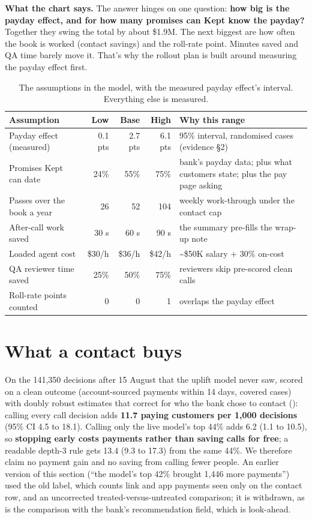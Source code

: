 \documentclass[11pt]{article}
\begin{document}
\textbf{What the chart says.} The answer hinges on one question: \textbf{how big is the payday effect, and for how many
promises can Kept know the payday?} Together they swing the total by about \$1.9M. The next biggest are how often the book is worked (contact savings) and
the roll-rate point. Minutes saved and QA time barely move it. That's why the rollout plan is built around measuring the
payday effect first.

\begin{table}[htbp]\small\centering
\begin{tabularx}{\linewidth}{@{}lrrrL@{}}
\toprule
\textbf{Assumption} & \textbf{Low} & \textbf{Base} & \textbf{High} & \textbf{Why this range} \\
\midrule
Payday effect (measured) & 0.1 pts & 2.7 pts & 6.1 pts & 95\% interval, randomised cases (evidence §2) \\
Promises Kept can date & 24\% & 55\% & 75\% & bank's payday data; plus what customers state; plus the pay page asking \\
Passes over the book a year & 26 & 52 & 104 & weekly work-through under the contact cap \\
After-call work saved & 30 s & 60 s & 90 s & the summary pre-fills the wrap-up note \\
Loaded agent cost & \$30/h & \$36/h & \$42/h & \textasciitilde \$50K salary + 30\% on-cost \\
QA reviewer time saved & 25\% & 50\% & 75\% & reviewers skip pre-scored clean calls \\
Roll-rate points counted & 0 & 0 & 1 & overlaps the payday effect \\
\bottomrule
\end{tabularx}
\caption{The assumptions in the model, with the measured payday effect's interval. Everything else is measured.}
\end{table}

\section{What a contact buys}

On the 141,350 decisions after 15 August that the uplift model never saw, scored on a clean outcome (account-sourced payments within
14 days, covered cases) with doubly robust estimates that correct for who the bank chose to contact
(): calling every call decision adds \textbf{11.7 paying customers per 1,000
decisions} (95\% CI 4.5 to 18.1). Calling only the live model's top 44\% adds 6.2 (1.1 to 10.5), so \textbf{stopping early
costs payments rather than saving calls for free}; a readable depth-3 rule gets 13.4 (9.3 to 17.3) from the same 44\%.
We therefore claim no payment gain and no saving from calling fewer people. An earlier version of this section
(``the model's top 42\% brought 1,446 more payments'') used the old label, which counts link and app payments seen only on the
contact row, and an uncorrected treated-versus-untreated comparison; it is withdrawn, as is the comparison with the bank's
recommendation field, which is look-ahead.
\end{document}

